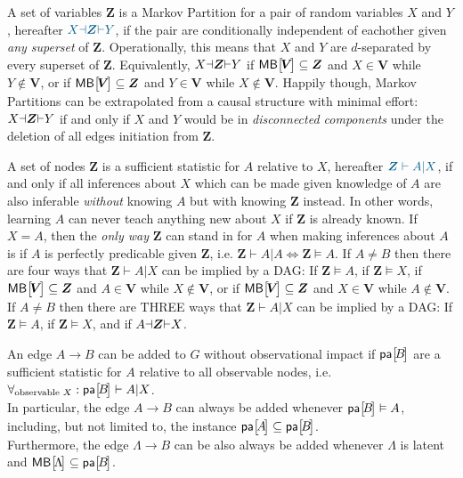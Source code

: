   A set of variables $\bm{Z}$ is a Markov Partition for a pair of random variables $X$ and $Y$, hereafter $\mblue{X\cramp{\dashv}\bm{Z}\cramp{\vdash}Y}$, if the pair are conditionally independent of eachother given \emph{any superset} of $\bm{Z}$. Operationally, this means that $X$ and $Y$ are $d$-separated by every superset of $\bm{Z}$. Equivalently, ${X\mathord{\dashv}\bm{Z}\mathord{\vdash}Y}$ if $\NamedFunction{MB}{\!\bm{V}\!}\subseteq \bm{Z}$ and $X\in \bm{V}$ while $Y\not\in \bm{V}$, or if $\NamedFunction{MB}{\!\bm{V}\!}\subseteq \bm{Z}$ and $Y\in \bm{V}$ while $X\not\in \bm{V}$. Happily though, Markov Partitions can be extrapolated from a causal structure with minimal effort: ${X\mathord{\dashv}\bm{Z}\mathord{\vdash}Y}$ if and only if $X$ and $Y$ would be in \emph{disconnected components} under the deletion of all edges initiation from $\bm{Z}$. 

 A set of nodes $\bm{Z}$ is a sufficient statistic for $A$ relative to $X$, hereafter $\mblue{\bm{Z}\vdash A|X}$,
if and only if all inferences about $X$ which can be made given knowledge of $A$ are also inferable \emph{without} knowing $A$ but with knowing $\bm{Z}$ instead. In other words, learning $A$ can never teach anything new about $X$ if $\bm{Z}$ is already known. If $X=A$, then the \emph{only way} $\bm{Z}$ can stand in for $A$ when making inferences about $A$ is if $A$ is perfectly predicable given $\bm{Z}$, i.e. ${\bm{Z}\vdash A|A\iff \bm{Z}\vDash A}$. If $A\neq B$ then there are four  ways that $\bm{Z}\vdash A|X$ can be implied by a DAG: If $\bm{Z}\vDash A$, if $\bm{Z}\vDash X$, if $\NamedFunction{MB}{\!\bm{V}\!}\subseteq \bm{Z}$ and $A\in \bm{V}$ while $X\not\in \bm{V}$, or if $\NamedFunction{MB}{\!\bm{V}\!}\subseteq \bm{Z}$ and $X\in \bm{V}$ while $A\not\in \bm{V}$.  If $A\neq B$ then there are THREE ways that $\bm{Z}\vdash A|X$ can be implied by a DAG: If $\bm{Z}\vDash A$, if $\bm{Z}\vDash X$, and if ${A\mathord{\dashv}\bm{Z}\mathord{\vdash}X}$.

\begin{theorem}\label{theo:edgeadding}
An edge $A\to B$ can be added to $G$ without observational impact if $\NamedFunction{pa}{\!B\!}$ are a sufficient statistic for $A$ relative to all observable nodes, i.e. $\forall_{\text{observable }X}:\NamedFunction{pa}{\!B\!}\vdash A|X$.\\
In particular, the edge $A\to B$ can always be added whenever $\NamedFunction{pa}{\!B\!}\vDash A$, including, but not limited to, the instance  $\NamedFunction{pa}{\!A\!}\subseteq \NamedFunction{pa}{\!B\!}$.\\
Furthermore, the edge $\Lambda\to B$ can be also always be added whenever $\Lambda$ is latent and $\NamedFunction{MB}{\!\Lambda\!}\subseteq\NamedFunction{pa}{\!B\!}$.
\end{theorem}

